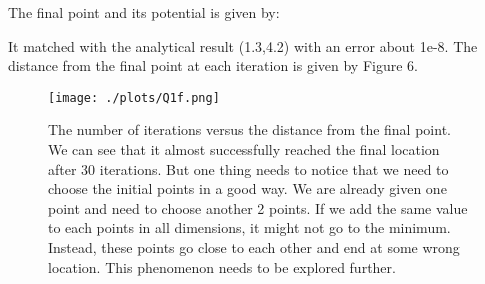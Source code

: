 The final point and its potential is given by:

It matched with the analytical result (1.3,4.2) with an error about 1e-8.
The distance from the final point at each iteration is given by Figure 6.


\begin{figure}[h!]
  \centering
  \texttt{[image: ./plots/Q1f.png]}
  \caption{The number of iterations versus the distance from the final point. We can see that it almost successfully reached the final location after 30 iterations. But one thing needs to notice that we need to choose the initial points in a good way. We are already given one point and need to choose another 2 points. If we add the same value to each points in all dimensions, it might not go to the minimum. Instead, these points go close to each other and end at some wrong location. This phenomenon needs to be explored further.}
  \label{fig6}
\end{figure}
